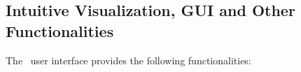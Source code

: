\subsection{Intuitive Visualization, GUI and Other Functionalities}
\label{sec:gui}

\begin{comment}
(a) permit an already partially generated atlas to be input; in this case algorithm proceeds from one of the unfinished regions of the current stratification; \\
(b) start from a specified bi-tether or a specified region of the current stratification; \\
(c) change the traversal of the stratification from depth to breadth first, for any specified region of the current stratification; \\
(d) choose to only traverse specified regions of the current stratification; \\
(e) allows increased sampling refinement for specified regions. \\
(f) limits stratification to regions satisfying global assembly constraints \\
(g) extends stratification to include regions defined by active global assembly constraints.\\
\end{comment}






The \EASAL\ user interface provides the following functionalities:

